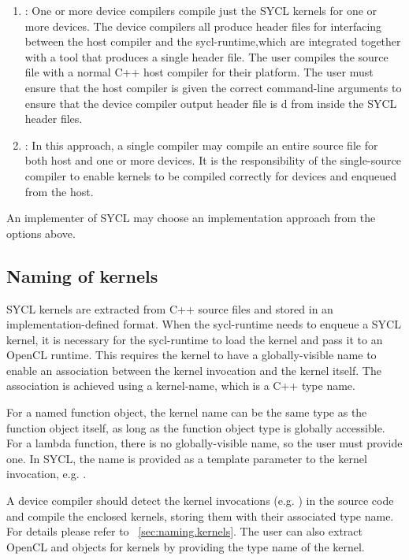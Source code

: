\begin{enumerate}
\item
   :
        One or more device compilers compile just the SYCL kernels for one
        or more devices.
        The device compilers all produce header files for interfacing between
        the \gls{host} compiler and the \gls{sycl-runtime},which are integrated 
  together with a tool that produces a single header file.
        The user compiles the source file with a normal C++ host compiler for
        their platform.
        The user must ensure that the host compiler is given the correct
        command-line arguments to ensure that the device
        compiler output header file is d from inside the SYCL
        header files.
\item
   :
    In this approach, a single compiler may compile an entire source file
    for both host and one or more devices.  It is the responsibility of the
    single-source compiler to enable kernels to be compiled correctly for
    devices and enqueued from the host.
 \end{enumerate}

An implementer of SYCL may choose an implementation approach from the options
above.

\subsection{Naming of kernels}

SYCL kernels are extracted from C++ source files and stored in an
implementation-defined format. When the \gls{sycl-runtime} needs to enqueue a SYCL
kernel, it is necessary for the \gls{sycl-runtime} to load the kernel and pass it to an
OpenCL runtime. This requires the kernel to have a globally-visible name to
enable an association between the kernel invocation and the kernel itself. The
association is achieved using a \gls{kernel-name}, which is a C++ type
name.

For a named function object, the kernel name can be the same type as the function object itself,
as long as the function object type is globally accessible. For a lambda function,
there is no globally-visible name, so the user must provide one. In SYCL,
the name is provided as a template parameter to the kernel invocation, e.g.
.

A device compiler should detect the kernel invocations (e.g.
) in the source code and compile the
enclosed kernels, storing them with their associated type name. For details
please refer to ~\ref{sec:naming.kernels}.
The user can also extract OpenCL  and
 objects for kernels by providing the type name of the
kernel.




